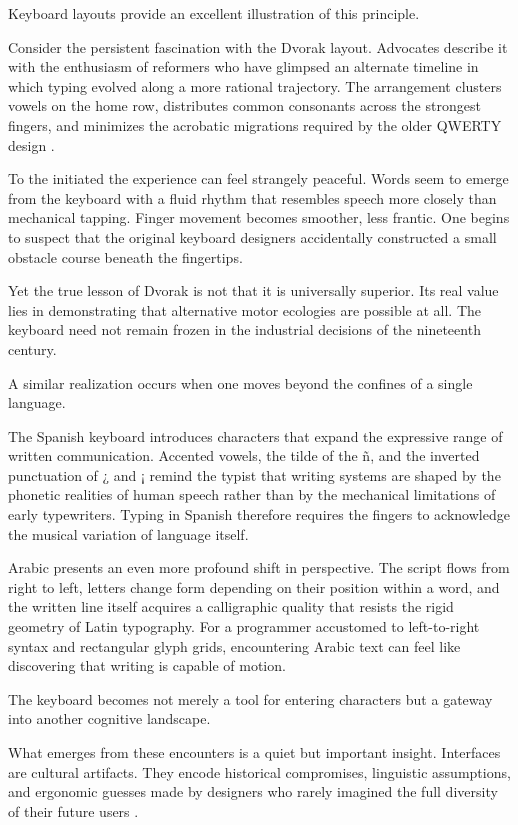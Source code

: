 \documentclass[11pt]{article}
\theoremstyle{definition}
\begin{document}
Keyboard layouts provide an excellent illustration of this principle.

Consider the persistent fascination with the Dvorak layout. Advocates
describe it with the enthusiasm of reformers who have glimpsed an
alternate timeline in which typing evolved along a more rational
trajectory. The arrangement clusters vowels on the home row, distributes
common consonants across the strongest fingers, and minimizes the
acrobatic migrations required by the older QWERTY design \cite{yamada1980}.

To the initiated the experience can feel strangely peaceful. Words seem
to emerge from the keyboard with a fluid rhythm that resembles speech
more closely than mechanical tapping. Finger movement becomes smoother,
less frantic. One begins to suspect that the original keyboard designers
accidentally constructed a small obstacle course beneath the fingertips.

Yet the true lesson of Dvorak is not that it is universally superior.
Its real value lies in demonstrating that alternative motor ecologies
are possible at all. The keyboard need not remain frozen in the
industrial decisions of the nineteenth century.

A similar realization occurs when one moves beyond the confines of a
single language.

The Spanish keyboard introduces characters that expand the expressive
range of written communication. Accented vowels, the tilde of the
\~n, and the inverted punctuation of ¿ and ¡ remind the typist that
writing systems are shaped by the phonetic realities of human speech
rather than by the mechanical limitations of early typewriters.
Typing in Spanish therefore requires the fingers to acknowledge the
musical variation of language itself.

Arabic presents an even more profound shift in perspective. The script
flows from right to left, letters change form depending on their
position within a word, and the written line itself acquires a
calligraphic quality that resists the rigid geometry of Latin typography.
For a programmer accustomed to left-to-right syntax and rectangular
glyph grids, encountering Arabic text can feel like discovering that
writing is capable of motion.

The keyboard becomes not merely a tool for entering characters but a
gateway into another cognitive landscape.

What emerges from these encounters is a quiet but important insight.
Interfaces are cultural artifacts. They encode historical compromises,
linguistic assumptions, and ergonomic guesses made by designers who
rarely imagined the full diversity of their future users \cite{norman1988}.
\end{document}
